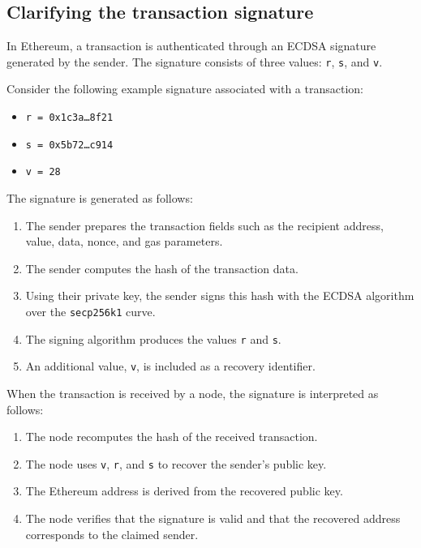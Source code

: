 \documentclass{scrbook}
\begin{document}
\subsection{Clarifying the transaction signature}

In Ethereum, a transaction is authenticated through an ECDSA signature generated by the sender. The signature consists of three values: \texttt{r}, \texttt{s}, and \texttt{v}.

Consider the following example signature associated with a transaction:

\begin{itemize}
    \item \texttt{r = 0x1c3a\ldots 8f21}
    \item \texttt{s = 0x5b72\ldots c914}
    \item \texttt{v = 28}
\end{itemize}

The signature is generated as follows:

\begin{enumerate}
    \item The sender prepares the transaction fields such as the recipient address, value, data, nonce, and gas parameters.
    \item The sender computes the hash of the transaction data.
    \item Using their private key, the sender signs this hash with the ECDSA algorithm over the \texttt{secp256k1} curve.
    \item The signing algorithm produces the values \texttt{r} and \texttt{s}.
    \item An additional value, \texttt{v}, is included as a recovery identifier.
\end{enumerate}

When the transaction is received by a node, the signature is interpreted as follows:

\begin{enumerate}
    \item The node recomputes the hash of the received transaction.
    \item The node uses \texttt{v}, \texttt{r}, and \texttt{s} to recover the sender's public key.
    \item The Ethereum address is derived from the recovered public key.
    \item The node verifies that the signature is valid and that the recovered address corresponds to the claimed sender.
\end{enumerate}
\end{document}
